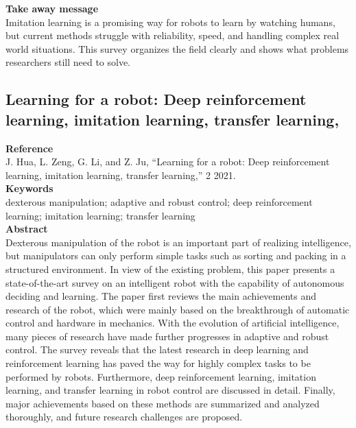 \documentclass[report.tex]{subfiles}
\begin{document}
\noindent\textbf{Take away message}  \\
Imitation learning is a promising way for robots to learn by watching humans, but current methods struggle with reliability, speed, and handling complex real world situations. This survey organizes the field clearly and shows what problems researchers still need to solve.













\subsection{Learning for a robot: Deep reinforcement learning, imitation
learning, transfer learning,} 

\noindent\textbf{Reference} \\
\cite{hua_learning_2021}J. Hua, L. Zeng, G. Li, and Z. Ju, “Learning for a robot: Deep reinforcement learning, imitation
learning, transfer learning,” 2 2021. \\


\noindent\textbf{Keywords} \\
dexterous manipulation; adaptive and robust control; deep reinforcement learning; imitation
learning; transfer learning
   \\

\noindent\textbf{Abstract} \\
Dexterous manipulation of the robot is an important part of realizing intelligence, but manipulators
can only perform simple tasks such as sorting and packing in a structured environment. In view of
the existing problem, this paper presents a state-of-the-art survey on an intelligent robot with the
capability of autonomous deciding and learning. The paper first reviews the main achievements and
research of the robot, which were mainly based on the breakthrough of automatic control and
hardware in mechanics. With the evolution of artificial intelligence, many pieces of research have
made further progresses in adaptive and robust control. The survey reveals that the latest research in
deep learning and reinforcement learning has paved the way for highly complex tasks to be
performed by robots. Furthermore, deep reinforcement learning, imitation learning, and transfer
learning in robot control are discussed in detail. Finally, major achievements based on these
methods are summarized and analyzed thoroughly, and future research challenges are proposed.\\
\end{document}
